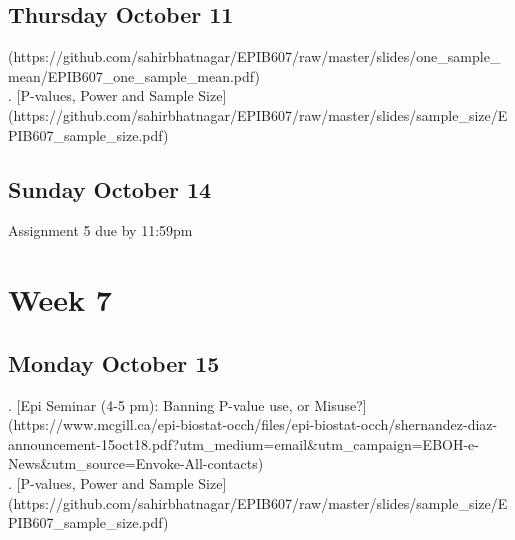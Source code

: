 \documentclass[]{book}
\let\originaltabular\tabular
\let\endoriginaltabular\endtabular
\renewenvironment{tabular}[1]{%
  \begingroup%
  \centering%
  \originaltabular{#1}}%
  {\endoriginaltabular\endgroup}
\theoremstyle{definition}
\theoremstyle{definition}
\theoremstyle{definition}
\theoremstyle{remark}
\begin{document}
\subsection{Thursday October 11}\label{thursday-october-11}

\begin{table}[H]
\centering
\begin{tabular}{l}
(https://github.com/sahirbhatnagar/EPIB607/raw/master/slides/one\_sample\_mean/EPIB607\_one\_sample\_mean.pdf)\\
. [P-values, Power and Sample Size](https://github.com/sahirbhatnagar/EPIB607/raw/master/slides/sample\_size/EPIB607\_sample\_size.pdf)\\
\hline
\end{tabular}
\end{table}

\subsection{Sunday October 14}\label{sunday-october-14}

\begin{table}[H]
\centering
\begin{tabular}{l}
\hline
Assignment 5 due by 11:59pm\\
\hline
\end{tabular}
\end{table}

\section{Week 7}\label{week-7}

\subsection{Monday October 15}\label{monday-october-15}

\begin{table}[H]
\centering
\begin{tabular}{l}
. [Epi Seminar (4-5 pm): Banning P-value use, or Misuse?](https://www.mcgill.ca/epi-biostat-occh/files/epi-biostat-occh/shernandez-diaz-announcement-15oct18.pdf?utm\_medium=email\&utm\_campaign=EBOH-e-News\&utm\_source=Envoke-All-contacts)\\
. [P-values, Power and Sample Size](https://github.com/sahirbhatnagar/EPIB607/raw/master/slides/sample\_size/EPIB607\_sample\_size.pdf)\\
\hline
\end{tabular}
\end{table}
\end{document}
